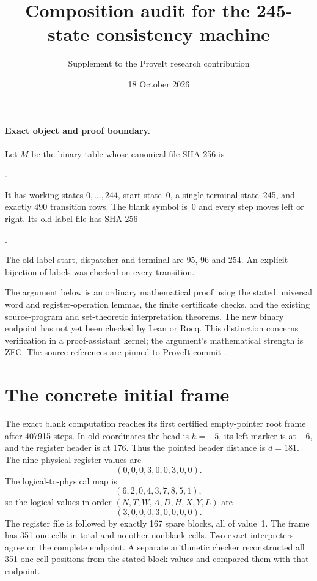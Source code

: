 \documentclass[11pt]{article}
\title{Composition audit for the 245-state consistency machine}
\author{Supplement to the ProveIt research contribution}
\date{18 October 2026}
\begin{document}
\maketitle

\paragraph{Exact object and proof boundary.}
Let $M$ be the binary table whose canonical file SHA-256 is
\begin{center}\small
{}.
\end{center}
It has working states $0,\ldots,244$, start state~0, a single terminal
state~245, and exactly 490 transition rows. The blank symbol is~0 and every
step moves left or right. Its old-label file has SHA-256
\begin{center}\small
{}.
\end{center}
The old-label start, dispatcher and terminal are 95, 96 and 254. An explicit
bijection of labels was checked on every transition.

The argument below is an ordinary mathematical proof using the stated
universal word and register-operation lemmas, the finite certificate checks,
and the existing source-program and set-theoretic interpretation theorems.
The new binary endpoint has not yet been checked by Lean or Rocq. This
distinction concerns verification in a proof-assistant kernel; the argument's
mathematical strength is ZFC. The source references are pinned to ProveIt
commit .

\section{The concrete initial frame}

The exact blank computation reaches its first certified empty-pointer root
frame after 407915 steps. In old coordinates the head is $h=-5$, its left
marker is at $-6$, and the register header is at 176. Thus the pointed
header distance is $d=181$. The nine physical register values are
\[
 (0,0,0,3,0,0,3,0,0).
\]
The logical-to-physical map is
\[
 (6,2,0,4,3,7,8,5,1),
\]
so the logical values in order $(N,T,W,A,D,H,X,Y,L)$ are
\[
 (3,0,0,0,3,0,0,0,0).                       \tag{1}
\]
The register file is followed by exactly 167 spare blocks, all of value~1.
The frame has 351 one-cells in total and no other nonblank cells. Two exact
interpreters agree on the complete endpoint. A separate arithmetic checker
reconstructed all 351 one-cell positions from the stated block values and
compared them with that endpoint.
\end{document}
